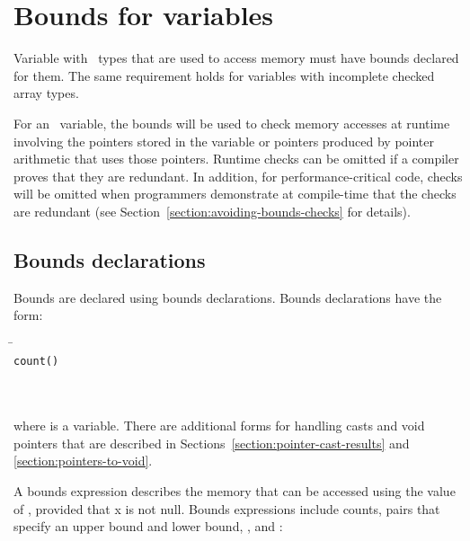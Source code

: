 
\chapter{Bounds for variables}
\label{chapter:tracking-bounds}

Variable with \arrayptr\ types that are used to access
memory must have bounds declared for them.  The same requirement
holds for variables with incomplete checked array types.

For an \arrayptr\ variable, the bounds will be used to check
memory accesses at runtime involving the pointers stored in the variable
or pointers produced by pointer arithmetic that uses those pointers.
Runtime checks can be omitted if a compiler proves that they are
redundant. In addition, for performance-critical code, checks will be
omitted when programmers demonstrate at compile-time that the checks are
redundant (see Section~\ref{section:avoiding-bounds-checks} for details).

\section{Bounds declarations}
\label{section:bounds-declarations}

Bounds are declared using bounds declarations. Bounds declarations have
the form:

\begin{quote}
\end{quote}

\begin{tabbing}
\= \\
\> \texttt{count(}\texttt{)} \\
\>  \\
\> \boundsnone \\
\> \boundsany
\end{tabbing}

where  is a variable. There are additional forms for handling
casts and void pointers that are described in 
Sections~\ref{section:pointer-cast-results} and \ref{section:pointers-to-void}.

A bounds expression describes the memory that can be accessed using the
value of , provided that x is not null. Bounds expressions
include counts, pairs that specify an upper bound and lower bound,
\boundsnone, and \boundsany:

